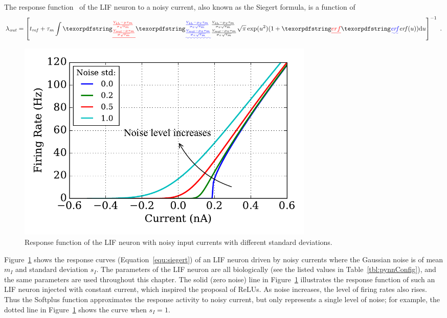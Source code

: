 	The response function~\citep{rauch2003neocortical,la2008response} of the LIF neuron to a noisy current, also known as the Siegert formula, is a function of \DIFdelbegin {}\DIFdelend \DIFaddbegin {}\DIFaddend \begin{equation}
	\lambda_\mathit{out}=
	\left [ t_\mathit{ref}+\tau_m \int\DIFdelbegin \DIFdel{_{\frac{V_\mathit{rest}-\mu \tau_m }{\sigma \sqrt{\tau_m}}}^{\frac{V_{th}-\mu \tau_m }{\sigma \sqrt{\tau_m}}} }\DIFdelend \DIFaddbegin \DIFadd{_{\frac{V_\mathit{rest}-\mu_v \tau_m }{\sigma_v \sqrt{\tau_m}}}^{\frac{V_{th}-\mu_v \tau_m }{\sigma_v \sqrt{\tau_m}}} }\DIFaddend \sqrt{\pi} \exp(u^{2}) (1+\DIFdelbegin \DIFdel{erf}\DIFdelend \DIFaddbegin \DIFadd{\mathit{erf}}\DIFaddend (u)) \D u \right ]^{-1} ~.
	\label{equ:siegert}
	\end{equation}


	
	\begin{figure}[bt]
		\centering
		\DIFdelbeginFL %
\DIFdelendFL \DIFaddbeginFL \includegraphics[width=0.7\textwidth]{pics_iconip/revise_1.pdf}
		\DIFaddendFL \caption[Response function of the LIF neuron.]{Response function of the LIF neuron with noisy input currents with different standard deviations.}
		\label{Fig:physics}
	\end{figure}

	Figure~\ref{Fig:physics} shows the response curves (Equation~\ref{equ:siegert}) of an LIF neuron driven by noisy currents where the Gaussian noise is of mean $m_I$ and standard deviation $s_I$.
	The parameters of the LIF neuron are all biologically \DIFdelbegin {}\DIFdelend \DIFaddbegin {}\DIFaddend (see the listed values in Table~\ref{tbl:pynnConfig}), and the same parameters are used throughout this chapter.
	The solid (zero noise) line in Figure~\ref{Fig:physics} illustrates the response function of such an LIF neuron injected with constant current, which inspired the proposal of ReLUs.
	As noise increases, the level of firing rates also rises.
	Thus the Softplus function approximates the response activity to noisy current, but only represents a single level of noise; for example, the dotted line in Figure~\ref{Fig:physics} shows the curve when $s_I=1$.
		\DIFdelbegin %

